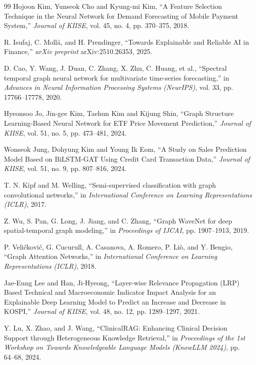 \begin{thebibliography}{99}
Hojoon Kim, Yunseok Cho and Kyung-mi Kim,
``A Feature Selection Technique in the Neural Network for Demand Forecasting of Mobile Payment System,''
\emph{Journal of KIISE}, vol. 45, no. 4, pp. 370--375, 2018.

R. Isufaj, C. Moll\'{a}, and H. Prendinger,
``Towards Explainable and Reliable AI in Finance,''
\emph{arXiv preprint} arXiv:2510.26353, 2025.

D. Cao, Y. Wang, J. Duan, C. Zhang, X. Zhu, C. Huang, et al.,
``Spectral temporal graph neural network for multivariate time-series forecasting,''
in \emph{Advances in Neural Information Processing Systems (NeurIPS)},
vol. 33, pp. 17766--17778, 2020.

Hyeonsoo Jo, Jin-gee Kim, Taehun Kim and Kijung Shin,
``Graph Structure Learning-Based Neural Network for ETF Price Movement Prediction,''
\emph{Journal of KIISE}, vol. 51, no. 5, pp. 473--481, 2024.

Wonseok Jung, Dohyung Kim and Young Ik Eom,
``A Study on Sales Prediction Model Based on BiLSTM-GAT Using Credit Card Transaction Data,''
\emph{Journal of KIISE}, vol. 51, no. 9, pp. 807--816, 2024.

T. N. Kipf and M. Welling,
``Semi-supervised classification with graph convolutional networks,''
in \emph{International Conference on Learning Representations (ICLR)}, 2017.

Z. Wu, S. Pan, G. Long, J. Jiang, and C. Zhang,
``Graph WaveNet for deep spatial-temporal graph modeling,''
in \emph{Proceedings of IJCAI}, pp. 1907--1913, 2019.

P. Veli\v{c}kovi\'{c}, G. Cucurull, A. Casanova, A. Romero, P. Li\`{o}, and Y. Bengio,
``Graph Attention Networks,''
in \emph{International Conference on Learning Representations (ICLR)}, 2018.

Jae-Eung Lee and Han, Ji-Hyeong,
``Layer-wise Relevance Propagation (LRP) Based Technical and Macroeconomic Indicator Impact Analysis for an Explainable Deep Learning Model to Predict an Increase and Decrease in KOSPI,''
\emph{Journal of KIISE}, vol. 48, no. 12, pp. 1289--1297, 2021.

Y. Lu, X. Zhao, and J. Wang,
``ClinicalRAG: Enhancing Clinical Decision Support through Heterogeneous Knowledge Retrieval,''
in \emph{Proceedings of the 1st Workshop on Towards Knowledgeable Language Models (KnowLLM 2024)},
pp. 64--68, 2024.


\end{thebibliography}
